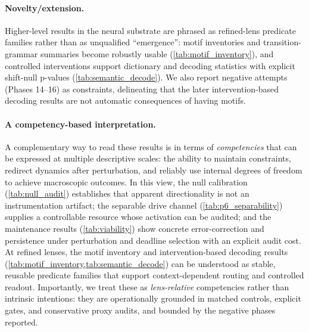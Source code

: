 \documentclass[11pt]{article}
\begin{document}
\paragraph{Novelty/extension.}
Higher-level results in the neural substrate are phrased as refined-lens predicate families rather than as unqualified ``emergence'': motif inventories and transition-grammar summaries become robustly usable (\cref{tab:motif_inventory}), and controlled interventions support dictionary and decoding statistics with explicit shift-null p-values (\cref{tab:semantic_decode}). We also report negative attempts (Phases 14--16) as constraints, delineating that the later intervention-based decoding results are not automatic consequences of having motifs.

\paragraph{A competency-based interpretation.}
A complementary way to read these results is in terms of \emph{competencies} that can be expressed at multiple descriptive scales: the ability to maintain constraints, redirect dynamics after perturbation, and reliably use internal degrees of freedom to achieve macroscopic outcomes. In this view, the null calibration (\cref{tab:null_audit}) establishes that apparent directionality is not an instrumentation artifact; the separable drive channel (\cref{tab:p6_separability}) supplies a controllable resource whose activation can be audited; and the maintenance results (\cref{tab:viability}) show concrete error-correction and persistence under perturbation and deadline selection with an explicit audit cost. At refined lenses, the motif inventory and intervention-based decoding results (\cref{tab:motif_inventory,tab:semantic_decode}) can be understood as stable, reusable predicate families that support context-dependent routing and controlled readout. Importantly, we treat these as \emph{lens-relative} competencies rather than intrinsic intentions: they are operationally grounded in matched controls, explicit gates, and conservative proxy audits, and bounded by the negative phases reported.
\end{document}
